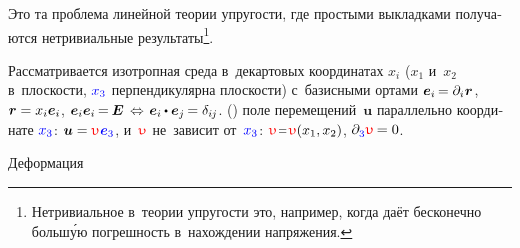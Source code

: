 \begin{otherlanguage}{russian}

\newcommand\antiplanedisplacement{\mathcolor{red}{\upupsilon}}

Это та проблема линейной теории упругости, где простыми выкладками получаются нетривиальные результаты\footnote{Нетривиальное в~теории упругости это, например, когда  даёт бесконечно больш\'{у}ю погрешность в~нахождении напряжения.}\hbox{\hspace{-1ex}.}

Рассматривается изотропная среда в~декартовых координатах $x_i$ ($x_1$ и~$x_2$ в~плоскости, $\mathcolor{blue}{x_3}$ перпендикулярна плоскости)
с~базисными ортами
${\bm{e}_i \hspace{-0.2ex} = \partial_i \hspace{.1ex} \bm{r}}$\hbox{\hspace{-0.12ex},}
${\bm{r} = x_i \bm{e}_i}$,
${\bm{e}_i \bm{e}_i \hspace{-0.2ex} = \hspace{-0.15ex} \UnitDyad \,\Leftrightarrow\hspace{.25ex} \bm{e}_i \hspace{-0.1ex} \dotp \bm{e}_j \hspace{-0.2ex} = \delta_{i\hspace{-0.1ex}j}}$.
  () поле перемещений~$\bm{u}$ параллельно координате $\mathcolor{blue}{x_3}$:
${\bm{u} = \antiplanedisplacement \hspace{.12ex} \mathcolor{blue}{\bm{e}_3}}$, и~$\antiplanedisplacement$ не~зависит от~$\mathcolor{blue}{x_3}$: ${\antiplanedisplacement \narroweq \antiplanedisplacement(x_1, x_2)}$, ${\partial_{\raisemath{-0.15ex}{\mathcolor{blue}{3}}} \antiplanedisplacement \hspace{-0.15ex} = 0}$.

Деформация


\end{otherlanguage}
